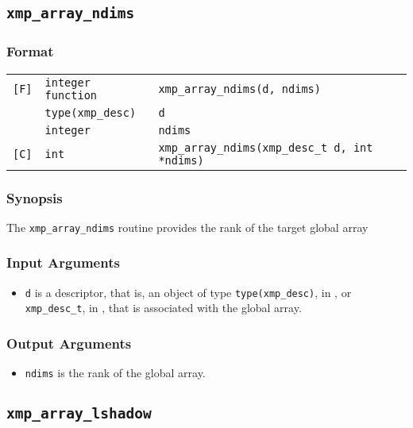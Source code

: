 \subsection{\tt xmp\_array\_ndims}

\subsubsection*{Format}

\begin{tabular}{lll}

\verb![F]!& {\tt integer function}& {\tt xmp\_array\_ndims(d, ndims)}\\
          & {\tt type(xmp\_desc)} & {\tt d}\\
          & {\tt integer} & {\tt ndims}\\

\verb![C]!&  {\tt int}& {\tt xmp\_array\_ndims(xmp\_desc\_t d, int *ndims)}\\

\end{tabular}

\subsubsection*{Synopsis}

The {\tt xmp\_array\_ndims} routine provides the rank of the target global array


\subsubsection*{Input Arguments}
\begin{itemize}
 \item {\tt d} is a descriptor, that is, an object of type 
       {\tt type(xmp\_desc)}, in {\XMPF}, or {\tt xmp\_desc\_t},
       in {\XMPC}, that is associated with the global array.
\end{itemize}

\subsubsection*{Output Arguments}
\begin{itemize}
 \item {\tt ndims} is the rank of the global array.
\end{itemize}


\subsection{\tt xmp\_array\_lshadow}

